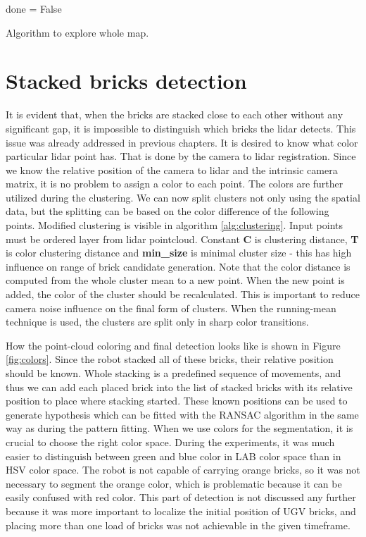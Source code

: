 \begin{algorithm}[H]
	done = False\;
	\caption{Algorithm to explore whole map.}
	\label{alg:exploration}
\end{algorithm}

\section{Stacked bricks detection}
It is evident that, when the bricks are stacked close to each other without any significant gap, it is impossible to distinguish which bricks the lidar detects. This issue was already addressed in previous chapters. It is desired to know what color particular lidar point has. That is done by the camera to lidar registration. Since we know the relative position of the camera to lidar and the intrinsic camera matrix, it is no problem to assign a color to each point. The colors are further utilized during the clustering. We can now split clusters not only using the spatial data, but the splitting can be based on the color difference of the following points. Modified clustering is visible in algorithm \ref{alg:clustering}. Input points must be ordered layer from lidar pointcloud. Constant \textbf{C} is clustering distance, \textbf{T} is color clustering distance and \textbf{min\_size} is minimal cluster size - this has high influence on range of brick candidate generation. Note that the color distance is computed from the whole cluster mean to a new point. When the new point is added, the color of the cluster should be recalculated. This is important to reduce camera noise influence on the final form of clusters. When the running-mean technique is used, the clusters are split only in sharp color transitions. 

How the point-cloud coloring and final detection looks like is shown in Figure  \ref{fig:colors}. Since the robot stacked all of these bricks, their relative position should be known. Whole stacking is a predefined sequence of movements, and thus we can add each placed brick into the list of stacked bricks with its relative position to place where stacking started. These known positions can be used to generate hypothesis which can be fitted with the RANSAC algorithm in the same way as during the pattern fitting. When we use colors for the segmentation, it is crucial to choose the right color space. During the experiments, it was much easier to distinguish between green and blue color in LAB color space than in HSV color space. The robot is not capable of carrying orange bricks, so it was not necessary to segment the orange color, which is problematic because it can be easily confused with red color. This part of detection is not discussed any further because it was more important to localize the initial position of UGV bricks, and placing more than one load of bricks was not achievable in the given timeframe.


